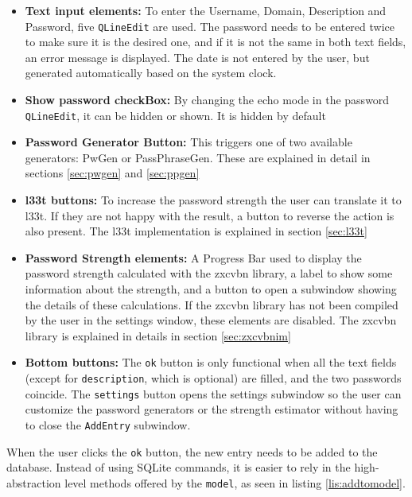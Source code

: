 \begin{itemize}
\setlength\itemsep{-3pt}

\item \textbf{Text input elements: }To enter the Username, Domain, Description and Password, five \texttt{QLineEdit} are used. The password needs to be entered twice to make sure it is the desired one, and if it is not the same in both text fields, an error message is displayed. The date is not entered by the user, but generated automatically based on the system clock.
\item \textbf{Show password checkBox: }By changing the echo mode in the password \texttt{QLineEdit}, it can be hidden or shown. It is hidden by default
\item \textbf{Password Generator Button: }This triggers one of two available generators: PwGen or PassPhraseGen. These are explained in detail in sections \ref{sec:pwgen} and \ref{sec:ppgen}
\item \textbf{l33t buttons: }To increase the password strength the user can translate it to l33t. If they are not happy with the result, a button to reverse the action is also present. The l33t implementation is explained in section \ref{sec:l33t}
\item \textbf{Password Strength elements: } A Progress Bar used to display the password strength calculated with the zxcvbn library, a label to show some information about the strength, and a button to open a subwindow showing the details of these calculations. If the zxcvbn library has not been compiled by the user in the settings window, these elements are disabled. The zxcvbn library is explained in details in section  \ref{sec:zxcvbnim}
\item \textbf{Bottom buttons: }The \texttt{ok} button is only functional when all the text fields (except for \texttt{description}, which is optional) are filled, and the two passwords coincide. The \texttt{settings} button opens the settings subwindow so the user can customize the password generators or the strength estimator without having to close the \texttt{AddEntry} subwindow.

\end{itemize}

When the user clicks the \texttt{ok} button, the new entry needs to be added to the database. Instead of using SQLite commands, it is easier to rely in the high-abstraction level methods offered by the \texttt{model}, as seen in listing \ref{lis:addtomodel}.


